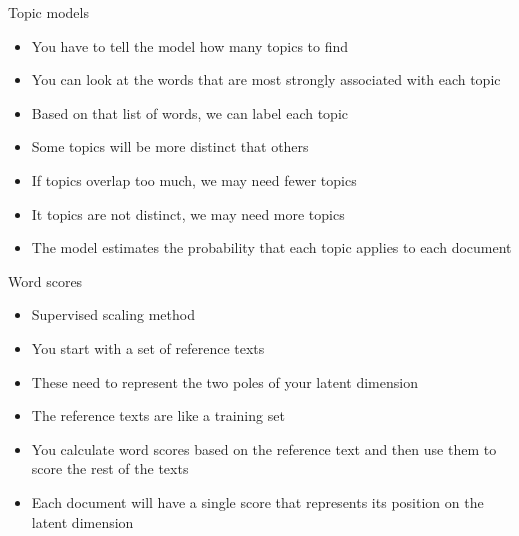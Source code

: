 \documentclass[pdf, 9pt, fleqn, handout]{beamer}
\begin{document}
\begin{frame}{Topic models}
\begin{itemize}
\item You have to tell the model how many topics to find \\[1em]
\item You can look at the words that are most strongly associated with each topic \\[1em]
\item Based on that list of words, we can label each topic \\[1em]
\item Some topics will be more distinct that others \\[1em]
\item If topics overlap too much, we may need fewer topics \\[1em]
\item It topics are not distinct, we may need more topics \\[1em]
\item The model estimates the probability that each topic applies to each document
\end{itemize}
\end{frame}

\begin{frame}{Word scores}
\begin{itemize}
\item Supervised scaling method \\[1em]
\item You start with a set of reference texts \\[1em]
\item These need to represent the two poles of your latent dimension \\[1em]
\item The reference texts are like a training set \\[1em]
\item You calculate word scores based on the reference text and then use them to score the rest of the texts \\[1em]
\item Each document will have a single score that represents its position on the latent dimension
\end{itemize}
\end{frame}
\end{document}
